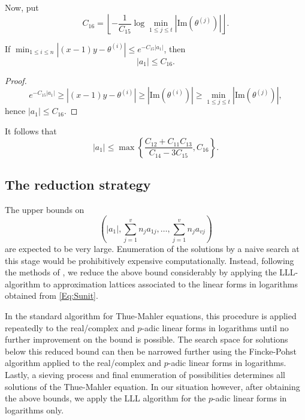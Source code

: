 {%

Now, put 
$$
C_{16} = \left\lfloor{-\frac{1}{C_{15}} \log \min_{1 \leq j \leq t} |\text{Im} (\theta^{(j)})|}\right\rfloor.
$$
\begin{lemma}
If $\displaystyle \min_{1\leq i\leq n}|(x-1)y-\theta^{(i)}| \leq e^{-C_{15}|a_1|}$, then 
\[|a_1| \leq C_{16}.\]
\end{lemma}

\begin{proof}
\[e^{-C_{15}|a_1|} \geq |(x-1)y-\theta^{(i)}| \geq |\text{Im}(\theta^{(i)})| \geq \min_{1 \leq j \leq t} |\text{Im} (\theta^{(j)})|,\]
hence $|a_1| \leq C_{16}$.
\end{proof}

It follows that 
\[|a_1| \leq \max\left\{\frac{C_{12} + C_{11}C_{13}}{C_{14} - 3C_{15}}, C_{16}\right\}.\] 

\subsection{The reduction strategy} 

The upper bounds on 
\[\left(|a_1|, \sum_{j = 1}^v n_ja_{1j}, \dots, \sum_{j = 1}^v n_ja_{vj}\right)\]
are expected to be very large. Enumeration of the solutions by a naive search at this stage would be prohibitively expensive computationally. Instead, following the methods of \cite{TW3}, we reduce the above bound considerably by applying the LLL-algorithm to approximation lattices associated to the linear forms in logarithms obtained from \eqref{Eq:Sunit}. 

In the standard algorithm for Thue-Mahler equations, this procedure is applied repeatedly to the real/complex and $p$-adic linear forms in logarithms until no further improvement on the bound is possible. The search space for solutions below this reduced bound can then be narrowed further using the Fincke-Pohst algorithm applied to the real/complex and $p$-adic linear forms in logarithms. Lastly, a sieving process and final enumeration of possibilities determines all solutions of the Thue-Mahler equation. In our situation however, after obtaining the above bounds, we apply the LLL algorithm for the $p$-adic linear forms in logarithms only. 

}
